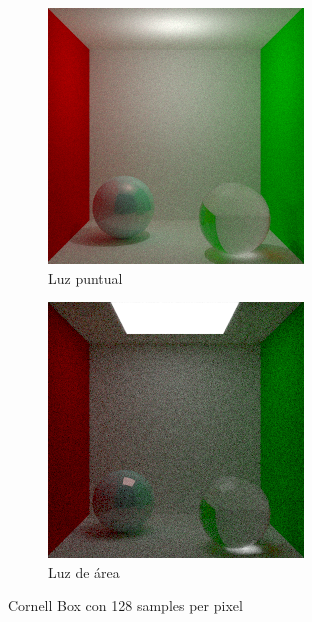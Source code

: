 \documentclass{article}
\begin{document}
\begin{figure}[H]
\begin{subfigure}[h]{0.4\linewidth}
\includegraphics[width=\linewidth]{imgs/cosine_box128.png}
\caption{Luz puntual}
\end{subfigure}
\hfill
\begin{subfigure}[h]{0.4\linewidth}
\includegraphics[width=\linewidth]{imgs/area_box128.png}
\caption{Luz de área}
\end{subfigure}%
\caption{Cornell Box con 128 samples per pixel}
\end{figure}
\end{document}
